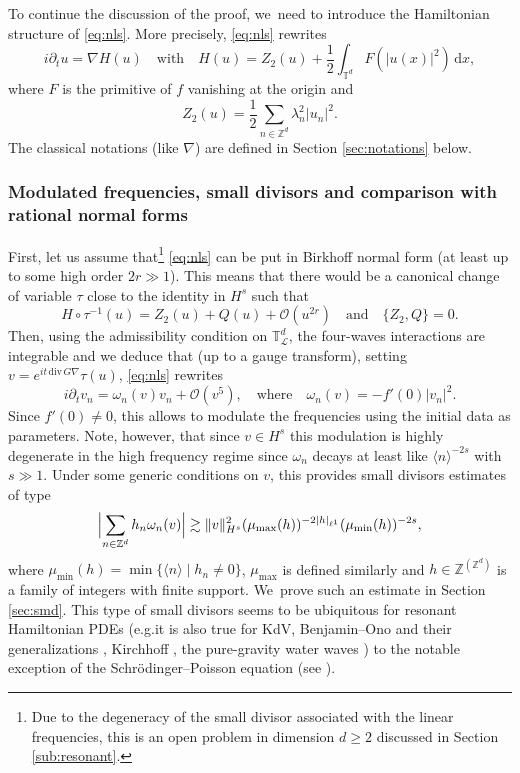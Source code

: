 \documentclass[10pt,a4paper]{amsart}
\providecommand{\eg}{e.g.}
\theoremstyle{plain}
\theoremstyle{definition}
\newcommand{\1}{\mathbf{1}}
\providecommand{\Subsubsection}{\subsubsection}
\providecommand{\Subsubsection}{\subsubsection}
\begin{document}
To continue the discussion of the proof, we~need to introduce the Hamiltonian structure of \eqref{eq:nls}. More precisely, \eqref{eq:nls} rewrites
\begin{equation}
\label{eq:hamNLS}
i\partial_t u = \nabla H(u) \quad \mathrm{with} \quad H(u) = Z_2(u)+ \frac12 \int_{\mathbb{T}^d} F(|u(x)|^2) \, \mathrm{d}x,
\end{equation}
where $F$ is the primitive of $f$ vanishing at the origin and
\[
Z_2(u) = \frac12 \sum_{n\in \mathbb{Z}^d} \lambda_n^2 |u_n|^2.
\]
The classical notations (like $\nabla$) are defined in Section \ref{sec:notations} below.

\Subsubsection{Modulated frequencies, small divisors and comparison with rational normal forms} First, let us assume that\footnote{Due to the degeneracy of the small divisor associated with the linear frequencies, this is an open problem in dimension $d\geq 2$ discussed in Section \ref{sub:resonant}.} \eqref{eq:nls} can be put in Birkhoff normal form (at least up to some high order $2r \gg 1$). This means that there would be a canonical change of variable $\tau$ close to the identity in $H^s$ such that
\begin{equation}
\label{eq:Birk_reve}
H\circ \tau^{-1}(u) = Z_2(u) + Q(u) + \mathcal{O}(u^{2r}) \quad \mathrm{and} \quad \{ Z_2,Q \} =0.
\end{equation}
Then, using the admissibility condition on $\mathbb{T}^d_{\mathscr{L}}$, the four-waves interactions are integrable and we deduce that (up to a gauge transform), setting $v=e^{it \, \mathrm{div} \, G \nabla }\tau(u)$, \eqref{eq:nls} rewrites
\[
i\partial_t v_n = \omega_n(v) v_n + \mathcal{O}(v^5), \quad \mathrm{where} \quad \omega_n(v) = - f'(0) |v_n|^2.
\]
Since $f'(0)\neq 0$, this allows to modulate the frequencies using the initial data as parameters. Note, however, that since $v\in H^s$ this modulation is highly degenerate in the high frequency regime since $\omega_n$ decays at least like $\langle n\rangle^{-2s}$ with $s\gg 1$. Under some generic conditions on $v$, this provides small divisors estimates of type
\begin{equation}
\label{eq:discussion_sd}
\Bigl| \sum_{n\in \mathbb{Z}^d} h_n \omega_{n}(v) \Bigr| \gtrsim \| v\|_{H^s}^2 (\mu_{\max}(h))^{-2|h|_{\ell^1}} (\mu_{\min}(h))^{-2s},
\end{equation}
where $\mu_{\min}(h) = \min \{ \langle n \rangle \mid h_n \neq 0 \}$, $\mu_{\max}$ is defined similarly and $h\in \mathbb{Z}^{(\mathbb{Z}^d)}$ is a family of integers with finite support. We~prove such an estimate in Section \ref{sec:smd}. This type of small divisors seems to be ubiquitous for resonant Hamiltonian PDEs (\eg it is also true for KdV, Benjamin--Ono and their generalizations \cite{KtA}, Kirchhoff \cite{BH22}, the pure-gravity water waves \cite{BFP23}) to the notable exception of the Schrödinger--Poisson equation (see \cite{KillBill,zhiqiang}).
\end{document}
